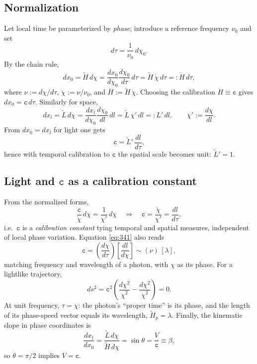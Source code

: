 \documentclass[11pt]{article}
\numberwithin{equation}{section}
\begin{document}
\subsection{Normalization}\label{sec:norm}
Let local time be parameterized by \emph{phase}; introduce a reference frequency $\nu_0$ and set
\begin{equation}
d\tau=\frac{1}{\nu_0}\,d\chi_0.
\label{eq:331}
\end{equation}
By the chain rule,
\begin{equation}
dx_0=\tilde{H}\,d\chi
=\frac{dx_0}{d\chi_0}\frac{d\chi_0}{d\tau}\,d\tau
=\tilde{H}\,\dot{\chi}\,d\tau
=: \dot{H}\,d\tau,
\label{eq:332}
\end{equation}
where $\nu:=d\chi/d\tau$, $\dot{\chi}:=\nu/\nu_0$, and $\dot{H}:=\tilde{H}\,\dot{\chi}$. Choosing the calibration $\dot{H}\equiv \mathtt{c}$ gives $dx_0=\mathtt{c}\,d\tau$. Similarly for space,
\begin{equation}
dx_l=\tilde{L}\,d\chi
=\frac{dx_l}{d\chi_0}\frac{d\chi_0}{dl}\,dl
=\tilde{L}\,\chi'\,dl
=:L'\,dl,\qquad \chi':=\frac{d\chi}{dl}.
\label{eq:333}
\end{equation}
From $dx_0=dx_l$ for light one gets
\begin{equation}
\mathtt{c}=\tilde{L}'\,\frac{dl}{d\tau},
\label{eq:334}
\end{equation}
hence with temporal calibration to $\mathtt{c}$ the spatial scale becomes unit: $\tilde{L}'=1$.

\subsection{Light and $\mathtt{c}$ as a calibration constant}
From the normalized forms,
\begin{equation}
\frac{\mathtt{c}}{\dot{\chi}}\,d\chi=\frac{1}{\chi'}\,d\chi
\quad\Rightarrow\quad
\mathtt{c}=\frac{\dot{\chi}}{\chi'}=\frac{dl}{d\tau},
\label{eq:341}
\end{equation}
i.e.\ $\mathtt{c}$ is a \emph{calibration constant} tying temporal and spatial measures, independent of local phase variation. Equation \eqref{eq:341} also reads
\begin{equation}
\mathtt{c}=\left(\frac{d\chi}{d\tau}\right)\!\left[\frac{dl}{d\chi}\right]\sim (\nu)\,[\lambda],
\label{eq:343}
\end{equation}
matching frequency and wavelength of a photon, with $\chi$ as its phase. For a lightlike trajectory,
\begin{equation}
ds^2=\mathtt{c}^2\!\left(\frac{d\chi^2}{\dot{\chi}^2}-\frac{d\chi^2}{\dot{\chi}^2}\right)=0.
\label{eq:344}
\end{equation}
At unit frequency, $\tau=\chi$: the photon's ``proper time'' is its phase, and the length of its phase-speed vector equals its wavelength, $\tilde{H}_p=\lambda$. Finally, the kinematic slope in phase coordinates is
\begin{equation}
\frac{dx_l}{dx_0}
=\frac{\tilde{L}\,d\chi}{\tilde{H}\,d\chi}
=\sin\theta
=\frac{V}{\mathtt{c}}
\equiv \beta,
\label{eq:345}
\end{equation}
so $\theta=\pi/2$ implies $V=\mathtt{c}$.
\end{document}

